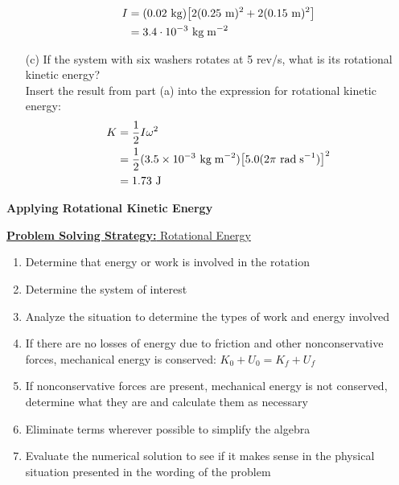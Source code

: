 \documentclass[a4paper]{article}
\let\bf\textbf
\newcommand\rads{\text{ rad\;s}^{-1}}
\newcommand\m{\text{ m}}
\newcommand\J{\text{ J}}
\newcommand\kg{\text{ kg}}
\newcommand\kgmm{\text{ kg\;m}^{-2}}
\begin{document}
\begin{shaded}
\begin{enumerate}
        \begin{align*}
            I &= (0.02\kg)\big[2(0.25\m)^2 + 2(0.15\m)^2\big]\\
            &= 3.4 \cdot 10^{-3}\kgmm
        \end{align*}
        \item[(c)] If the system with six washers rotates at 5 rev/s, what is its rotational kinetic energy?
        \vspace{1mm}\\
        Insert the result from part (a) into the expression for rotational kinetic energy:
        \begin{align*}
            K &= \frac{1}{2}I\omega^2\\
            &= \frac{1}{2}(3.5 \times 10^{-3}\kgmm)\big[5.0(2\pi\rads)\big]^2\\
            &= 1.73\J
        \end{align*}
    \end{enumerate}
\end{shaded}
\bf{Applying Rotational Kinetic Energy}
\begin{shaded}
    \underline{\bf{Problem Solving Strategy:} Rotational Energy}
    \begin{enumerate}
        \item Determine that energy or work is involved in the rotation
        \item Determine the system of interest
        \item Analyze the situation to determine the types of work and energy involved
        \item If there are no losses of energy due to friction and other nonconservative forces, mechanical energy is conserved: $K_0 + U_0 = K_f + U_f$
        \item If nonconservative forces are present, mechanical energy is not conserved, determine what they are and calculate them as necessary
        \item Eliminate terms wherever possible to simplify the algebra
        \item Evaluate the numerical solution to see if it makes sense in the physical situation presented in the wording of the problem
    \end{enumerate}
\end{shaded}
\end{document}
